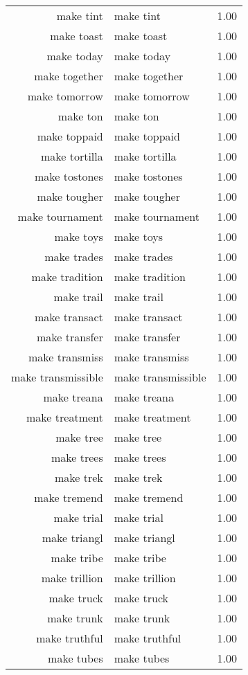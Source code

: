 \begin{table}[ht]
\begin{tabular}{rlr}
  make tint & make tint & 1.00 \\ 
  make toast & make toast & 1.00 \\ 
  make today & make today & 1.00 \\ 
  make together & make together & 1.00 \\ 
  make tomorrow & make tomorrow & 1.00 \\ 
  make ton & make ton & 1.00 \\ 
  make toppaid & make toppaid & 1.00 \\ 
  make tortilla & make tortilla & 1.00 \\ 
  make tostones & make tostones & 1.00 \\ 
  make tougher & make tougher & 1.00 \\ 
  make tournament & make tournament & 1.00 \\ 
  make toys & make toys & 1.00 \\ 
  make trades & make trades & 1.00 \\ 
  make tradition & make tradition & 1.00 \\ 
  make trail & make trail & 1.00 \\ 
  make transact & make transact & 1.00 \\ 
  make transfer & make transfer & 1.00 \\ 
  make transmiss & make transmiss & 1.00 \\ 
  make transmissible & make transmissible & 1.00 \\ 
  make treana & make treana & 1.00 \\ 
  make treatment & make treatment & 1.00 \\ 
  make tree & make tree & 1.00 \\ 
  make trees & make trees & 1.00 \\ 
  make trek & make trek & 1.00 \\ 
  make tremend & make tremend & 1.00 \\ 
  make trial & make trial & 1.00 \\ 
  make triangl & make triangl & 1.00 \\ 
  make tribe & make tribe & 1.00 \\ 
  make trillion & make trillion & 1.00 \\ 
  make truck & make truck & 1.00 \\ 
  make trunk & make trunk & 1.00 \\ 
  make truthful & make truthful & 1.00 \\ 
  make tubes & make tubes & 1.00 \\ 

\end{tabular}
\end{table}
